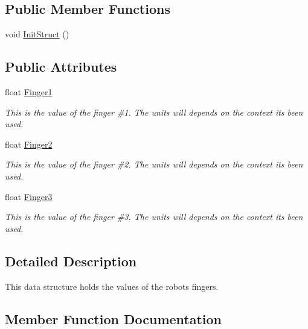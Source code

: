 \subsection*{Public Member Functions}
\begin{DoxyCompactItemize}
\item 
void \hyperlink{structFingersPosition_a2d958923675995d54d56e59f8549495d}{Init\+Struct} ()
\end{DoxyCompactItemize}
\subsection*{Public Attributes}
\begin{DoxyCompactItemize}
\item 
float \hyperlink{structFingersPosition_a216f8d64e6a9c7aab84e4269ccb27e66}{Finger1}
\begin{DoxyCompactList}\small\item\em This is the value of the finger \#1. The units will depends on the context it\textquotesingle{}s been used. \end{DoxyCompactList}\item 
float \hyperlink{structFingersPosition_a0ec9675672721d61fb13bbc2db3d3ef9}{Finger2}
\begin{DoxyCompactList}\small\item\em This is the value of the finger \#2. The units will depends on the context it\textquotesingle{}s been used. \end{DoxyCompactList}\item 
float \hyperlink{structFingersPosition_a03c819e4c20367e36e62a864bf829160}{Finger3}
\begin{DoxyCompactList}\small\item\em This is the value of the finger \#3. The units will depends on the context it\textquotesingle{}s been used. \end{DoxyCompactList}\end{DoxyCompactItemize}


\subsection{Detailed Description}
This data structure holds the values of the robot\textquotesingle{}s fingers. 

\subsection{Member Function Documentation}
